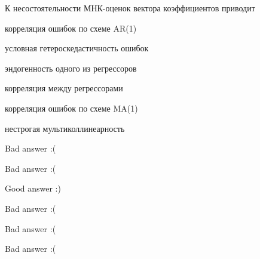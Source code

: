 
\begin{question}
К несостоятельности МНК-оценок вектора коэффициентов приводит
\begin{answerlist}
  \item корреляция ошибок по схеме AR(1)
  \item условная гетероскедастичность ошибок
  \item эндогенность одного из регрессоров
  \item корреляция между регрессорами
  \item корреляция ошибок по схеме MA(1)
  \item нестрогая мультиколлинеарность
\end{answerlist}
\end{question}

\begin{solution}
\begin{answerlist}
  \item Bad answer :(
  \item Bad answer :(
  \item Good answer :)
  \item Bad answer :(
  \item Bad answer :(
  \item Bad answer :(
\end{answerlist}
\end{solution}

